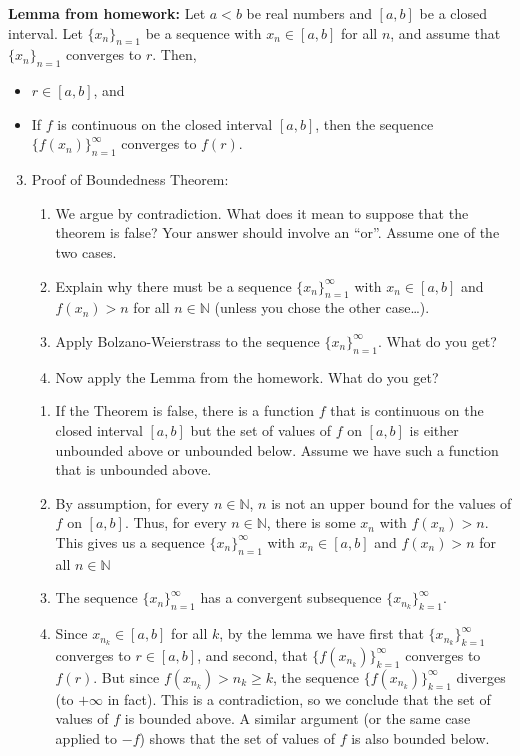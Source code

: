 \documentclass[12pt]{amsart}
\newcommand{\N}{\mathbb{N}}
\numberwithin{equation}{section}
\theoremstyle{plain} %
\theoremstyle{definition}
\theoremstyle{remark}
\begin{document}
\noindent \textbf{Lemma from homework:} Let $a<b$ be real numbers and $[a,b]$ be a closed interval. Let $\{x_n\}_{n=1}$ be a sequence with $x_n\in[a,b]$ for all $n$, and assume that $\{x_n\}_{n=1}$ converges to $r$. Then,
\begin{itemize}
\item $r\in [a,b]$, and
\item If $f$ is continuous on the closed interval $[a,b]$, then the sequence $\{f(x_n)\}_{n=1}^\infty$ converges to $f(r)$.
\end{itemize}



\begin{enumerate}\setcounter{enumi}{2}
\item Proof of Boundedness Theorem:
\begin{enumerate}
\item We argue by contradiction. What does it mean to suppose that the theorem is false? Your answer should involve an ``or''. Assume one of the two cases.
\item Explain why there must be a sequence $\{x_n\}_{n=1}^\infty$ with $x_n\in[a,b]$ and $f(x_n)>n$ for all $n\in \N$ (unless you chose the other case\dots).
\item Apply Bolzano-Weierstrass to the sequence $\{x_n\}_{n=1}^\infty$. What do you get?
\item Now apply the Lemma from the homework. What do you get?
\end{enumerate}
\begin{framed}
\begin{enumerate}
\item If the Theorem is false, there is a function $f$ that is continuous on the closed interval $[a,b]$ but the set of values of $f$ on $[a,b]$ is either unbounded above or unbounded below. Assume we have such a function that is unbounded above.
\item By assumption, for every $n\in \N$, $n$ is not an upper bound for the values of $f$ on $[a,b]$. Thus, for every $n\in \N$, there is some $x_n$ with $f(x_n)>n$. This gives us a sequence $\{x_n\}_{n=1}^\infty$ with $x_n\in[a,b]$ and $f(x_n)>n$ for all $n\in \N$
\item The sequence $\{x_n\}_{n=1}^\infty$ has a convergent subsequence $\{x_{n_k}\}_{k=1}^\infty$.
\item Since $x_{n_k}\in[a,b]$ for all $k$, by the lemma we have first that $\{x_{n_k}\}_{k=1}^\infty$ converges to $r\in [a,b]$, and second, that $\{f(x_{n_k})\}_{k=1}^\infty$ converges to $f(r)$. But since $f(x_{n_k})> n_k \geq k$, the sequence $\{f(x_{n_k})\}_{k=1}^\infty$ diverges (to $+\infty$ in fact). This is a contradiction, so we conclude that the set of values of $f$ is bounded above. A similar argument (or the same case applied to $-f$) shows that the set of values of $f$ is also bounded below.
\end{enumerate}
\end{framed}


\end{enumerate}
\end{document}
